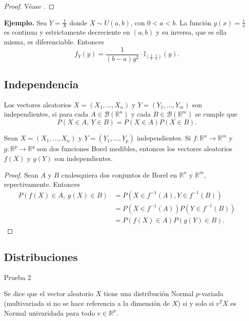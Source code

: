 \begin{proof}
    Véase \cite{rinconCursoIntermedioProbabilidad2007}.
\end{proof}

\noindent\textbf{Ejemplo.} Sea $Y=\frac{1}{X}$ donde $X\sim U(a,b)$, 
con $0<a<b$. La función $g(x) = \frac{1}{x}$ es continua y 
estrictamente decreciente en $(a,b)$ y su inversa, que es ella
misma, es diferenciable. Entonces 
$$f_Y(y) = \frac{1}{(b-a)y^2}
\cdot \mathbb I_{\left(\frac{1}{b},\frac{1}{a}\right)}(y).$$

\subsection{Independencia}

\begin{definition}
    Los vectores aleatorios $X=(X_1,...,X_n)$ y $Y=(Y_1,...,Y_m)$
    son independientes, si para cada $A\in \mathcal B(\mathbb R^n)$
    y cada $B\in \mathcal B(\mathbb R^m)$ se cumple que
    $$P(X\in A,\ Y\in B)=P(X\in A)P(X\in B).$$
\end{definition}

\begin{proposition}\label{prop:fun_vect_indep}
    Sean $X=(X_1,...,X_n)$ y $Y=(Y_1,...,Y_p)$ independientes. Si 
    $f:\mathbb R^n \to \mathbb R^m$ y $g:\mathbb R^p \to \mathbb R^q$
    son dos funciones Borel medibles, entonces los vectores
    aleatorios $f(X)$ y $g(Y)$ son independientes.
\end{proposition}

\begin{proof}
    Sean $A$ y $B$ cualesquiera dos conjuntos de Borel en $\mathbb R^n$
    y $\mathbb R^m$, repectivamente. Entonces
    \begin{align*}
        P(f(X)\in A,\ g(X)\in B)&= P(X\in f^{-1}(A),Y\in f^{-1}(B))\\
        &=  P(X\in f^{-1}(A))P(Y\in f^{-1}(B))\\
        &=  P(f(X)\in A)P(g(Y)\in B).
    \end{align*}
\end{proof}

\subsection{Distribuciones}

Prueba 2

\begin{definition}
    Se dice que el vector aleatorio $X$ tiene una distribución
    Normal $p$-variada (multivariada si no se hace referencia 
    a la dimensión de $X$) si y solo si $v^TX$ es Normal univaridada
    para todo $v\in \mathbb R^p$.
\end{definition}

